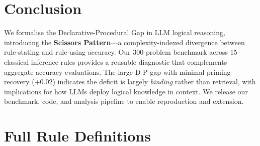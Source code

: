 \documentclass[11pt]{article}
\begin{document}
\section{Conclusion}
\label{sec:conclusion}

We formalise the Declarative-Procedural Gap in LLM logical reasoning,
introducing the \textbf{Scissors Pattern}---a complexity-indexed
divergence between rule-stating and rule-using accuracy.
Our 300-problem benchmark across 15 classical inference rules provides
a reusable diagnostic that complements aggregate accuracy evaluations.
The large D-P gap with minimal priming recovery (+0.02) indicates the
deficit is largely \emph{binding} rather than retrieval, with implications
for how LLMs deploy logical knowledge in context.
We release our benchmark, code, and analysis pipeline to enable
reproduction and extension.




\appendix

\section{Full Rule Definitions}
\label{app:rules}
\end{document}
